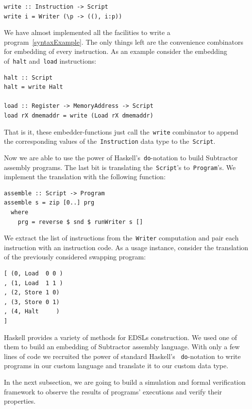\begin{verbatim}
write :: Instruction -> Script
write i = Writer (\p -> ((), i:p))
\end{verbatim}

We have almost implemented all the facilities to write a program~\ref{syntaxExample}.
The only things left are the convenience combinators for embedding of every instruction.
As an example consider the embedding of~\texttt{halt}
and~\texttt{load} instructions:

\begin{verbatim}
halt :: Script
halt = write Halt

load :: Register -> MemoryAddress -> Script
load rX dmemaddr = write (Load rX dmemaddr)
\end{verbatim}

That is it, these embedder-functions just call the~\texttt{write}
combinator to append the corresponding values of the~\texttt{Instruction}
data type to the~\texttt{Script}.

Now we are able to use the power of Haskell's~\texttt{do}-notation to
build Subtractor assembly programs. The last bit is translating
the~\texttt{Script}'s to~\texttt{Program}'s. We implement the
translation with the following function:

\begin{verbatim}
assemble :: Script -> Program
assemble s = zip [0..] prg
  where
    prg = reverse $ snd $ runWriter s []
\end{verbatim}

We extract the list of instructions from the~\texttt{Writer} computation
and pair each instruction with an instruction code. As a usage instance, consider the
translation of the previously considered swapping program:

\begin{verbatim}
[ (0, Load  0 0 )
, (1, Load  1 1 )
, (2, Store 1 0)
, (3, Store 0 1)
, (4, Halt     )
]
\end{verbatim}

Haskell provides a variety of methods for EDSLs construction.
We used one of them to build an embedding of Subtractor assembly language.
With only a few lines of code we recruited the power of standard Haskell's
~\texttt{do}-notation to write programs in our custom language and
translate it to our custom data type.

In the next subsection, we are going to build a simulation and formal verification
framework to observe the results of programs' executions and verify their properties.

